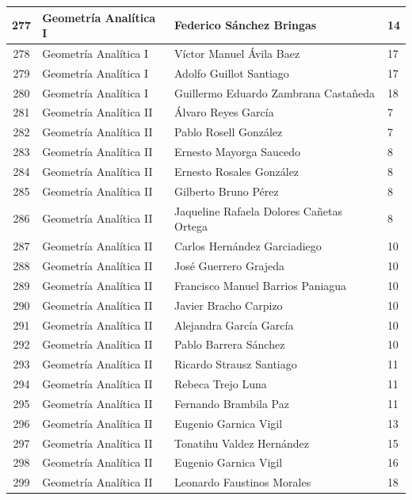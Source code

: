 {\begin{longtable}{|c|p{6.5cm}|p{5cm}|p{1.5cm}|}
  277 & Geometría Analítica I & Federico Sánchez Bringas & 14 \\ \hline 
  278 & Geometría Analítica I & Víctor Manuel Ávila Baez & 17 \\ \hline 
  279 & Geometría Analítica I & Adolfo Guillot Santiago & 17 \\ \hline 
  280 & Geometría Analítica I & Guillermo Eduardo Zambrana Castañeda & 18 \\ \hline 
  281 & Geometría Analítica II & Álvaro Reyes García & 7 \\ \hline 
  282 & Geometría Analítica II & Pablo Rosell González & 7 \\ \hline 
  283 & Geometría Analítica II & Ernesto Mayorga Saucedo & 8 \\ \hline 
  284 & Geometría Analítica II & Ernesto Rosales González & 8 \\ \hline 
  285 & Geometría Analítica II & Gilberto Bruno Pérez & 8 \\ \hline 
  286 & Geometría Analítica II & Jaqueline Rafaela Dolores Cañetas Ortega & 8 \\ \hline 
  287 & Geometría Analítica II & Carlos Hernández Garciadiego & 10 \\ \hline 
  288 & Geometría Analítica II & José Guerrero Grajeda & 10 \\ \hline 
  289 & Geometría Analítica II & Francisco Manuel Barrios Paniagua & 10 \\ \hline 
  290 & Geometría Analítica II & Javier Bracho Carpizo & 10 \\ \hline 
  291 & Geometría Analítica II & Alejandra García García & 10 \\ \hline 
  292 & Geometría Analítica II & Pablo Barrera Sánchez & 10 \\ \hline 
  293 & Geometría Analítica II & Ricardo Strausz Santiago & 11 \\ \hline 
  294 & Geometría Analítica II & Rebeca Trejo Luna & 11 \\ \hline 
  295 & Geometría Analítica II & Fernando Brambila Paz & 11 \\ \hline 
  296 & Geometría Analítica II & Eugenio Garnica Vigil & 13 \\ \hline 
  297 & Geometría Analítica II & Tonatihu Valdez Hernández & 15 \\ \hline 
  298 & Geometría Analítica II & Eugenio Garnica Vigil & 16 \\ \hline 
  299 & Geometría Analítica II & Leonardo Faustinos Morales & 18 \\ \hline 

\end{longtable}}
